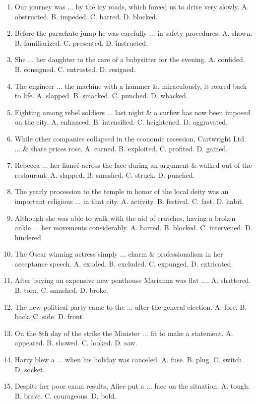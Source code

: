 \documentclass{article}
\numberwithin{equation}{section}
\begin{document}
\begin{enumerate}[leftmargin=2mm]
	\item Our journey was $\ldots$ by the icy roads, which forced us to drive very slowly. A. obstructed. B. impeded. C. barred. D. blocked.
	\item Before the parachute jump he was carefully $\ldots$ in safety procedures. A. shown. B. familiarized. C. presented. D. instructed.
	\item She $\ldots$ her daughter to the care of a babysitter for the evening. A. confided. B. consigned. C. entrusted. D. resigned.
	\item The engineer $\ldots$ the machine with a hammer \&, miraculously, it roared back to life. A. slapped. B. smacked. C. punched. D. whacked.
	\item Fighting among rebel soldiers $\ldots$ last night \& a curfew has now been imposed on the city. A. enhanced. B. intensified. C. heightened. D. aggravated.
	\item While other companies collapsed in the economic recession, Cartwright Ltd. $\ldots$ \& share prices rose. A. earned. B. exploited. C. profited. D. gained.
	\item Rebecca $\ldots$ her fianc\'e across the face during an argument \& walked out of the restaurant. A. slapped. B. smashed. C. struck. D. punched.
	\item The yearly procession to the temple in honor of the local deity was an important religious $\ldots$ in that city. A. activity. B. festival. C. fast. D. habit.
	\item Although she was able to walk with the aid of crutches, having a broken ankle $\ldots$ her movements considerably. A. barred. B. blocked. C. intervened. D. hindered.
	\item The Oscar winning actress simply $\ldots$ charm \& professionalism in her acceptance speech. A. exuded. B. excluded. C. expunged. D. extricated.
	\item After buying an expensive new penthouse Marianna was flat $\ldots$. A. shattered. B. torn. C. smashed. D. broke.
	\item The new political party came to the $\ldots$ after the general election. A. fore. B. back. C. side. D. front.
	\item On  the 8th day of the strike the Minister $\ldots$ fit to make a statement. A. appeared. B. showed. C. looked. D. saw.
	\item Harry blew a $\ldots$ when his holiday was canceled. A. fuse. B. plug. C. switch. D. socket.
	\item Despite her poor exam results, Alice put a $\ldots$ face on the situation. A. tough. B. brave. C. courageous. D. bold.

\end{enumerate}
\end{document}
